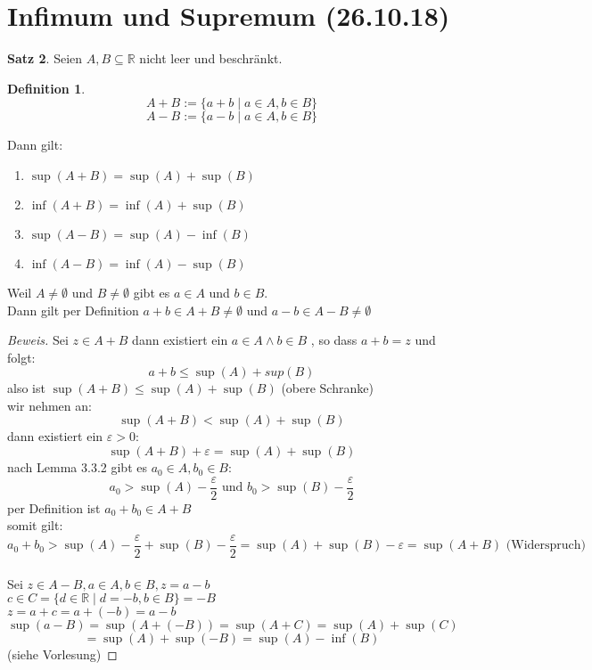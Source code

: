 \documentclass[12pt,a4paper,titlepage]{article} %
\theoremstyle{definition}
\newtheorem{satz}{Satz}[subsection]
\newtheorem{defi}[satz]{Definition}
\theoremstyle{remark}
\newenvironment{bew}{\begin{proof}[Beweis]}{\end{proof}}
\newcommand{\R}{\mathbb{R}}
\begin{document}
	\section{Infimum und Supremum (26.10.18)}
	\begin{satz}
		Seien \(A, B \subseteq \R\) nicht leer und beschränkt.
		\begin{defi}
			\[A + B := \{a + b \; | \; a \in A, b \in B\}\]
			\[A - B := \{a - b \; | \; a \in A, b \in B\}\]
		\end{defi}
		Dann gilt:
		\begin{enumerate}
			\item \(\sup(A + B) = \sup(A) + \sup(B)\)
			\item \(\inf(A + B) = \inf(A) + \sup(B)\)
			\item \(\sup(A - B) = \sup(A) - \inf(B)\)
			\item \(\inf(A - B) = \inf(A) - \sup(B)\)
		\end{enumerate}
		Weil \(A \neq \emptyset\) und \(B \neq \emptyset\) gibt es \(a \in A\) und \(b \in B\).\\
		Dann gilt per Definition \(a+b \in A+B \neq \emptyset\) und \(a-b \in A-B \neq \emptyset\)
	\end{satz}
	\begin{bew}
		Sei \(z \in A + B\) dann existiert ein \(a \in A \wedge b \in B\) , so dass \(a + b = z\) und folgt:
		\[a + b \leq \sup(A) + sup(B)\]	
		also ist \(\sup(A+B) \leq \sup(A) + \sup(B)\) (obere Schranke)\\
		wir nehmen an:
		\[\sup(A+B) < \sup(A) + \sup(B)\]
		dann existiert ein \(\varepsilon > 0\):
		\[\sup(A+B) + \varepsilon = \sup(A) + \sup(B)\]
		nach Lemma 3.3.2 gibt es \(a_0 \in A, b_0 \in B\):
		\[a_0 > \sup(A) - \frac{\varepsilon}{2} \text{ und } b_0 > \sup(B) - \frac{\varepsilon}{2}\]
		per Definition ist \(a_0 + b_0 \in A + B\)\\
		somit gilt:
		\[a_0 + b_0 > \sup(A) - \frac{\varepsilon}{2} + \sup(B) - \frac{\varepsilon}{2} = \sup(A) + \sup(B) - \varepsilon = \sup(A+B) \text{ (Widerspruch)}\]\\
		Sei \(z \in A - B, a \in A, b \in B, z = a - b\)\\
		\(c \in C = \{d \in \R \; | \; d = -b, b \in B\} = -B\)\\
		\(z = a + c = a + (-b) = a - b\) 
		\[\sup(a-B) = \sup(A + (-B)) = \sup(A + C) = \sup(A) + \sup(C)\]
		\[= \sup(A) + \sup(-B) = \sup(A) - \inf(B)\] (siehe Vorlesung)
	\end{bew}
\end{document}
